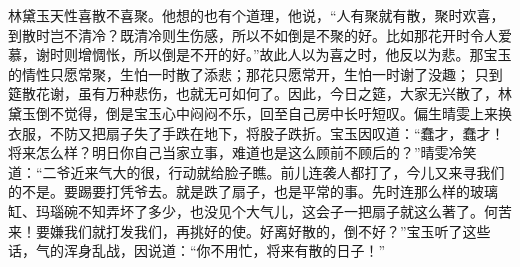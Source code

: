\begin{parag}


    林黛玉天性喜散不喜聚。他想的也有个道理，他说，“人有聚就有散，聚时欢喜，到散时岂不清冷？既清冷则生伤感，所以不如倒是不聚的好。比如那花开时令人爱慕，谢时则增惆怅，所以倒是不开的好。”故此人以为喜之时，他反以为悲。那宝玉的情性只愿常聚，生怕一时散了添悲；那花只愿常开，生怕一时谢了没趣； 只到筵散花谢，虽有万种悲伤，也就无可如何了。因此，今日之筵，大家无兴散了，林黛玉倒不觉得，倒是宝玉心中闷闷不乐，回至自己房中长吁短叹。偏生晴雯上来换衣服，不防又把扇子失了手跌在地下，将股子跌折。宝玉因叹道：“蠢才，蠢才！将来怎么样？明日你自己当家立事，难道也是这么顾前不顾后的？”晴雯冷笑 道：“二爷近来气大的很，行动就给脸子瞧。前儿连袭人都打了，今儿又来寻我们的不是。要踢要打凭爷去。就是跌了扇子，也是平常的事。先时连那么样的玻璃缸、玛瑙碗不知弄坏了多少，也没见个大气儿，这会子一把扇子就这么著了。何苦来！要嫌我们就打发我们，再挑好的使。好离好散的，倒不好？”宝玉听了这些话，气的浑身乱战，因说道：“你不用忙，将来有散的日子！”
\end{parag}


